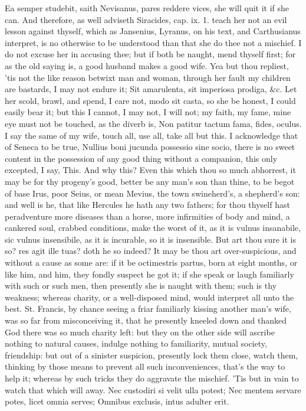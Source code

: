 {Ea semper studebit, saith Nevisanus, pares reddere vices, she
will quit it if she can. And therefore, as well adviseth Siracides,
cap. ix. 1. teach her not an evil lesson against thyself, which as
Jansenius, Lyranus, on his text, and Carthusianus interpret, is no
otherwise to be understood than that she do thee not a mischief. I do
not excuse her in accusing thee; but if both be naught, mend thyself
first; for as the old saying is, a good husband makes a good wife.
Yea but thou repliest, 'tis not the like reason betwixt man and woman,
through her fault my children are bastards, I may not endure it;
Sit amarulenta, sit imperiosa prodiga, \&c. Let her scold, brawl,
and spend, I care not, modo sit casta, so she be honest, I could easily
bear it; but this I cannot, I may not, I will not; my faith, my fame,
mine eye must not be touched, as the diverb is, Non patitur tactum
fama, fides, oculus. I say the same of my wife, touch all, use all,
take all but this. I acknowledge that of Seneca to be true, Nullius
boni jucunda possessio sine socio, there is no sweet content in the
possession of any good thing without a companion, this only excepted, I
say, This. And why this? Even this which thou so much abhorrest, it may
be for thy progeny's good,  better be any man's son than thine,
to be begot of base Irus, poor Seius, or mean Mevius, the town
swineherd's, a shepherd's son: and well is he, that like Hercules he
hath any two fathers; for thou thyself hast peradventure more diseases
than a horse, more infirmities of body and mind, a cankered soul,
crabbed conditions, make the worst of it, as it is vulnus insanabile,
sic vulnus insensibile, as it is incurable, so it is insensible. But
art thou sure it is so? res agit ille tuas? doth he so indeed? It
may be thou art over-suspicious, and without a cause as some are: if it
be octimestris partus, born at eight months, or like him, and him, they
fondly suspect he got it; if she speak or laugh familiarly with such or
such men, then presently she is naught with them; such is thy weakness;
whereas charity, or a well-disposed mind, would interpret all unto the
best. St. Francis, by chance seeing a friar familiarly kissing another
man's wife, was so far from misconceiving it, that he presently kneeled
down and thanked God there was so much charity left: but they on the
other side will ascribe nothing to natural causes, indulge nothing to
familiarity, mutual society, friendship: but out of a sinister
suspicion, presently lock them close, watch them, thinking by those
means to prevent all such inconveniences, that's the way to help it;
whereas by such tricks they do aggravate the mischief. 'Tis but in vain
to watch that which will away.
Nec custodiri si velit ulla potest;
Nec mentem servare potes, licet omnia serves;
Omnibus exclusis, intus adulter erit.

}
